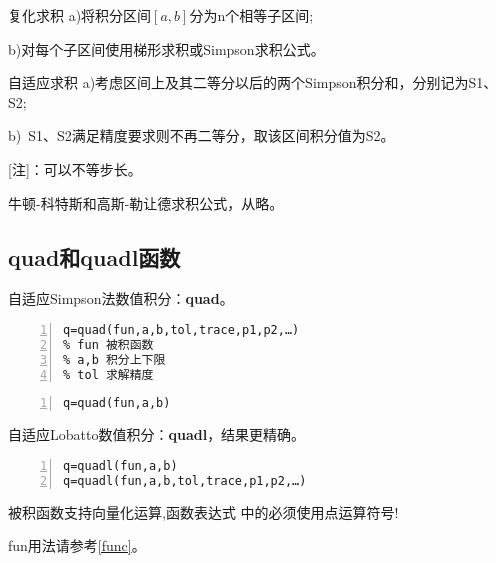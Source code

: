 \begin{definition}{复化求积}{}
a)将积分区间$[a,b]$分为n个相等子区间;

b)对每个子区间使用梯形求积或Simpson求积公式。
\end{definition}

\begin{definition}{自适应求积}{}
a)考虑区间上及其二等分以后的两个Simpson积分和，分别记为S1、S2;

b)~S1、S2满足精度要求则不再二等分，取该区间积分值为S2。

[注]：可以不等步长。
\end{definition}

\begin{note}
牛顿-科特斯和高斯-勒让德求积公式，从略。
\end{note}

\subsection{quad和quadl函数}
自适应Simpson法数值积分：\textcolor{third}{\textbf{quad}}。

\begin{lstlisting}[frame=single,numbers=left]
% 调用形式
q=quad(fun,a,b,tol,trace,p1,p2,…)
% fun 被积函数
% a,b 积分上下限
% tol 求解精度
\end{lstlisting}

\begin{lstlisting}[frame=single,numbers=left]
% 常用形式
q=quad(fun,a,b)
\end{lstlisting}
自适应Lobatto数值积分：\textcolor{third}{\textbf{quadl}}，结果更精确。
\begin{lstlisting}[frame=single,numbers=left]
% quadl函数与quad函数的使用完全一致
q=quadl(fun,a,b)
q=quadl(fun,a,b,tol,trace,p1,p2,…)
\end{lstlisting}

\begin{note}
被积函数支持向量化运算,函数表达式 中的必须使用点运算符号!
\end{note}

\begin{note}
fun用法请参考\ref{func}。
\end{note}
